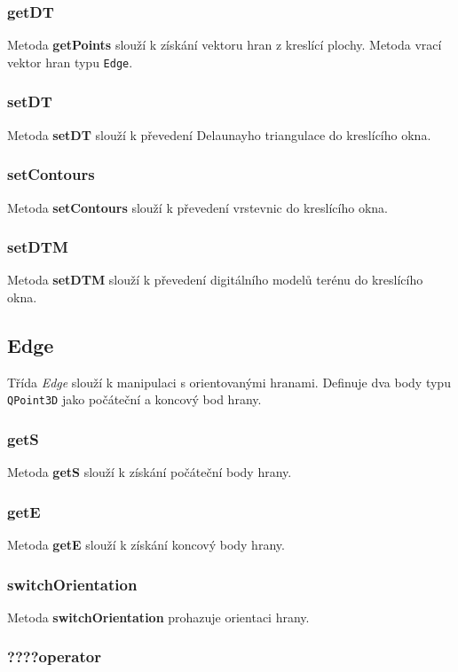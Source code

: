 \documentclass[a4paper, 12pt]{article}
\begin{document}
\subsubsection*{getDT}
Metoda \textbf{getPoints} slouží k získání vektoru hran z kreslící plochy. Metoda vrací vektor hran typu \texttt{Edge}.

\subsubsection*{setDT}
Metoda \textbf{setDT} slouží k převedení Delaunayho triangulace do kreslícího okna.

\subsubsection*{setContours}
Metoda \textbf{setContours} slouží k převedení vrstevnic do kreslícího okna.

\subsubsection*{setDTM}
Metoda \textbf{setDTM} slouží k převedení digitálního modelů terénu do kreslícího okna.


\subsection{Edge}
Třída \textit{Edge} slouží k manipulaci s orientovanými hranami. Definuje dva body typu \texttt{QPoint3D} jako počáteční a koncový bod hrany.

\subsubsection*{getS}
Metoda \textbf{getS} slouží k získání počáteční body hrany. 

\subsubsection*{getE}
Metoda \textbf{getE} slouží k získání koncový body hrany. 

\subsubsection*{switchOrientation}
Metoda \textbf{switchOrientation} prohazuje orientaci hrany.  

\subsubsection*{????operator}
\end{document}
